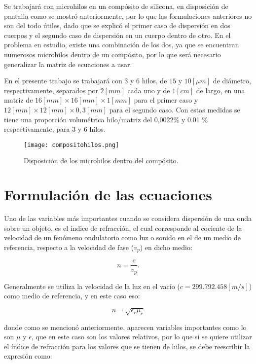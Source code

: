 \documentclass[12pt,letterpaper]{report}
\numberwithin{equation}{section}
\begin{document}
Se trabajará con microhilos en un compósito de silicona, en disposición de pantalla como se mostró anteriormente, por lo que las formulaciones anteriores no son del todo útiles, dado que se explicó el primer caso de dispersión en dos cuerpos y el segundo caso de dispersión en un cuerpo dentro de otro. En el problema en estudio, existe una combinación de los dos, ya que se encuentran numerosos microhilos dentro de un compósito, por lo que será necesario generalizar la matriz de ecuaciones a usar.

En el presente trabajo se trabajará con 3 y 6 hilos, de $15$ y $10 [\mu m]$ de diámetro, respectivamente, separados por $2 [mm]$ cada uno y de $1 [cm]$ de largo, en una matriz de $16 [mm] \times 16 [mm] \times 1 [mm]$ para el primer caso y $12 [mm] \times 12 [mm] \times 0,3 [mm]$ para el segundo caso. Con estas medidas se tiene una proporción volumétrica hilo/matriz del 0,0022\% y  0.01 \% respectivamente, para 3 y 6 hilos. 

\begin{figure}[H]
	\centering\texttt{[image: compositohilos.png]}
	\caption{Disposición de los microhilos dentro del compósito.}
\end{figure}

\section{Formulación de las ecuaciones}

Uno de las variables más importantes cuando se considera dispersión de una onda sobre un objeto, es el índice de refracción, el cual corresponde al cociente de la velocidad de un fenómeno ondulatorio como luz o sonido en el de un medio de referencia, respecto a la velocidad de fase ($v_{p}$) en dicho medio: 

\begin{equation}
n = \frac{c}{v_{p}}.
\end{equation}

Generalmente se utiliza la  velocidad de la luz en el vacío ($c=299.792.458 [m/s]$) como medio de referencia, y en este caso eso:

\begin{equation}
n = \sqrt{\epsilon_{r}\mu_{r}}
\end{equation}

\noindent donde como se mencionó anteriormente, aparecen variables importantes como lo son $\mu$ y $\epsilon$, que en este caso son los valores relativos, por lo que si se quiere utilizar el índice de refracción para los valores que se tienen de hilos, se debe reescribir la expresión como:
\end{document}
